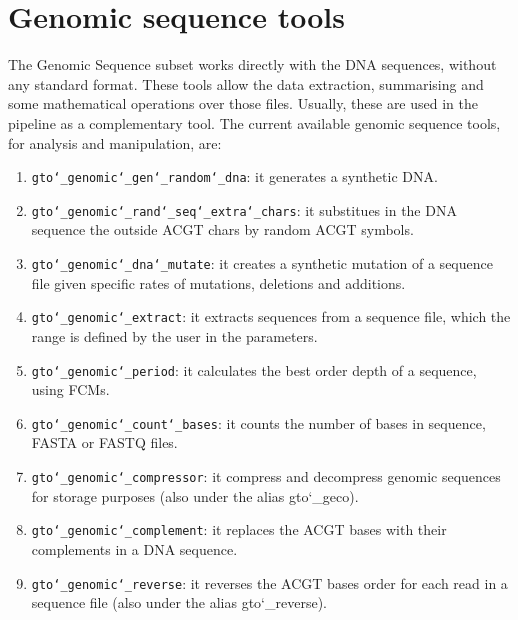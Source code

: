 \chapter{Genomic sequence tools}
\label{gst}
The Genomic Sequence subset works directly with the DNA sequences, without any standard format. These tools allow the data extraction, summarising and some mathematical operations over those files. Usually, these are used in the pipeline as a complementary tool. The current available genomic sequence tools, for analysis and manipulation, are:
\begin{enumerate}

\item \texttt{gto\char`_genomic\char`_gen\char`_random\char`_dna}: it generates a synthetic DNA.

\item \texttt{gto\char`_genomic\char`_rand\char`_seq\char`_extra\char`_chars}: it substitues in the DNA sequence the outside ACGT chars by random ACGT symbols.

\item \texttt{gto\char`_genomic\char`_dna\char`_mutate}: it creates a synthetic mutation of a sequence file given specific rates of mutations, deletions and additions.

\item \texttt{gto\char`_genomic\char`_extract}: it extracts sequences from a sequence file, which the range is defined by the user in the parameters.

\item \texttt{gto\char`_genomic\char`_period}: it calculates the best order depth of a sequence, using FCMs.

\item \texttt{gto\char`_genomic\char`_count\char`_bases}: it counts the number of bases in sequence, FASTA or FASTQ files.

\item \texttt{gto\char`_genomic\char`_compressor}: it compress and decompress genomic sequences for storage purposes (also under the alias gto\char`_geco).

\item \texttt{gto\char`_genomic\char`_complement}: it replaces the ACGT bases with their complements in a DNA sequence.

\item \texttt{gto\char`_genomic\char`_reverse}: it reverses the ACGT bases order for each read in a sequence file (also under the alias gto\char`_reverse).

\end{enumerate}










